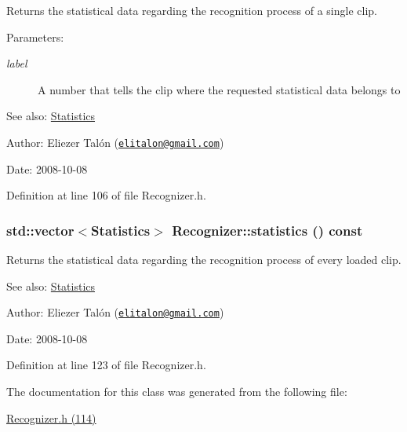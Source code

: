Returns the statistical data regarding the recognition process of a single clip. 

\begin{Desc}
\item[Parameters:]
\begin{description}
\item[{\em label}]A number that tells the clip where the requested statistical data belongs to\end{description}
\end{Desc}
\begin{Desc}
\item[See also:]\hyperlink{class_statistics}{Statistics}\end{Desc}
\begin{Desc}
\item[Author:]Eliezer Talón (\href{mailto:elitalon@gmail.com}{\tt elitalon@gmail.com}) \end{Desc}
\begin{Desc}
\item[Date:]2008-10-08 \end{Desc}


Definition at line 106 of file Recognizer.h.\hypertarget{class_recognizer_82b28c720acc5fcc26059a6b4ba93c1a}{
\subsubsection[statistics]{\setlength{\rightskip}{0pt plus 5cm}std::vector$<${\bf Statistics}$>$ Recognizer::statistics () const}}
\label{class_recognizer_82b28c720acc5fcc26059a6b4ba93c1a}


Returns the statistical data regarding the recognition process of every loaded clip. 

\begin{Desc}
\item[See also:]\hyperlink{class_statistics}{Statistics}\end{Desc}
\begin{Desc}
\item[Author:]Eliezer Talón (\href{mailto:elitalon@gmail.com}{\tt elitalon@gmail.com}) \end{Desc}
\begin{Desc}
\item[Date:]2008-10-08 \end{Desc}


Definition at line 123 of file Recognizer.h.

The documentation for this class was generated from the following file:\begin{CompactItemize}
\item 
\hyperlink{_recognizer_8h}{Recognizer.h (114)}\end{CompactItemize}

